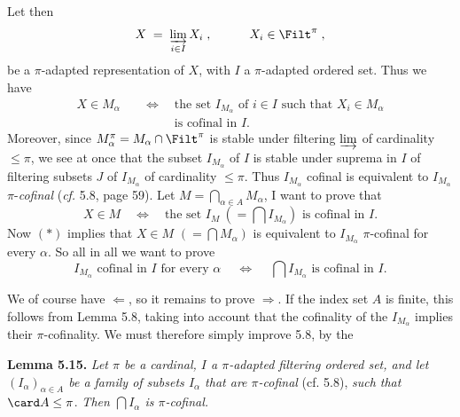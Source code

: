 Let then
\[
X \;=\; \varinjlim_{i\in I} X_{i} \; , \qquad\quad X_{i} \in \Filt^{\pi} \; ,
\]
be a $\pi$-adapted representation of $X$, with $I$ a $\pi$-adapted ordered set. Thus we have
\[
\begin{aligned}
X \in M_{\alpha} \quad &\Longleftrightarrow \quad \text{the set } I_{M_{\alpha}} \text{ of } i \in I \text{ such that } X_{i} \in M_{\alpha}\\
&\phantom{\Longleftrightarrow} \quad \text{is cofinal in } I.
\end{aligned}
\tag*{$(*)$}
\]
Moreover, since $M_{\alpha}^{\pi} = M_{\alpha} \cap \Filt^{\pi}$ is stable under filtering $\varinjlim$ of cardinality $\leq \pi$, we see at once that the subset $I_{M_{\alpha}}$ of $I$ is stable under suprema in $I$ of filtering subsets $J$ of $I_{M_{\alpha}}$ of cardinality $\leq \pi$. Thus $I_{M_{\alpha}}$ cofinal is equivalent to $I_{M_{\alpha}}$ $\pi$-\textit{cofinal} (\textit{cf.} 5.8, page 59). Let $M = \bigcap_{\alpha\in A} M_{\alpha}$, I want to prove that
\[
X \in M \quad \Longleftrightarrow \quad \text{the set } I_{M} \ (= \textstyle\bigcap I_{M_{\alpha}}) \text{ is cofinal in } I.
\tag*{$(**)$}
\]
Now $(*)$ implies that $X \in M$ $(= \bigcap M_{\alpha})$ is equivalent to $I_{M_{\alpha}}$ $\pi$-cofinal for every $\alpha$. So all in all we want to prove
\[
I_{M_{\alpha}} \text{ cofinal in } I \text{ for every } \alpha \quad\ \Longleftrightarrow \quad\ \textstyle\bigcap I_{M_{\alpha}} \text{ is cofinal in } I.
\tag*{$(***)$}
\]

We of course have $\Longleftarrow$, so it remains to prove $\Longrightarrow$. If the index set $A$ is finite, this follows from Lemma 5.8, taking into account that the cofinality of the $I_{M_{\alpha}}$ implies their $\pi$-cofinality. We must therefore simply improve 5.8, by the


\textbf{Lemma 5.15.} \textit{Let $\pi$ be a cardinal, $I$ a $\pi$-adapted filtering ordered set, and let $(I_{\alpha})_{\alpha\in A}$ be a family of subsets $I_{\alpha}$ that are $\pi$-cofinal} (cf. 5.8), \textit{such that} $\card A \leq \pi$. \textit{Then $\bigcap I_{\alpha}$ is $\pi$-cofinal.}


